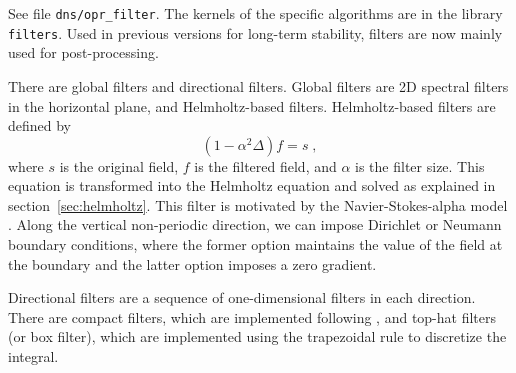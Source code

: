 See file {\tt dns/opr\_filter}. The kernels of the specific algorithms are in the library {\tt filters}. Used in previous versions for long-term stability, filters are now mainly used for post-processing.

There are global filters and directional filters. Global filters are 2D spectral filters in the horizontal plane, and Helmholtz-based filters. Helmholtz-based filters are defined by
\begin{equation}
  (1-\alpha^2\Delta) f = s \;,
\end{equation}
where $s$ is the original field, $f$ is the filtered field, and $\alpha$ is the filter size. This equation is transformed into the Helmholtz equation and solved as explained in section~\ref{sec:helmholtz}. This filter is motivated by the Navier-Stokes-alpha model \citep{Foias:2001}. Along the vertical non-periodic direction, we can impose Dirichlet or Neumann boundary conditions, where the former option maintains the value of the field at the boundary and the latter option imposes a zero gradient.

Directional filters are a sequence of one-dimensional filters in each direction. There are compact filters, which are implemented following \cite{Lele:1992}, and top-hat filters (or box filter), which are implemented using the trapezoidal rule to discretize the integral.


